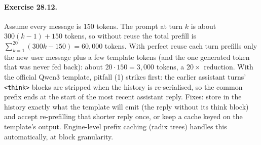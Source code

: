 \paragraph{Exercise 28.12.} Assume every message is 150 tokens. The prompt at turn $k$ is
about $300(k-1)+150$ tokens, so without reuse the total prefill is
$\sum_{k=1}^{20}(300k-150)=60{,}000$ tokens. With perfect reuse each turn prefills only
the new user message plus a few template tokens (and the one generated token that was
never fed back): about $20\cdot150=3{,}000$ tokens, a $20\times$ reduction. With the
official Qwen3 template, pitfall (1) strikes first: the earlier assistant turns'
\texttt{<think>} blocks are stripped when the history is re-serialised, so the common
prefix ends at the start of the most recent assistant reply. Fixes: store in the history
exactly what the template will emit (the reply without its think block) and accept
re-prefilling that shorter reply once, or keep a cache keyed on the template's output.
Engine-level prefix caching (radix trees) handles this automatically, at block
granularity.
